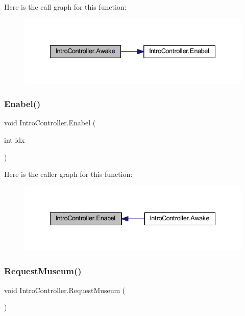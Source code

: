 Here is the call graph for this function\+:
\nopagebreak
\begin{figure}[H]
\begin{center}
\leavevmode
\includegraphics[width=335pt]{class_intro_controller_a2e454b9889a5f12aae6f0b9ada1534e8_cgraph}
\end{center}
\end{figure}
\mbox{\label{class_intro_controller_af189f110e2a1fc56f21c2e5d91af849f}} 
\subsubsection{\texorpdfstring{Enabel()}{Enabel()}}
{\footnotesize\ttfamily void Intro\+Controller.\+Enabel (\begin{DoxyParamCaption}\item[{int}]{idx }\end{DoxyParamCaption})}

Here is the caller graph for this function\+:
\nopagebreak
\begin{figure}[H]
\begin{center}
\leavevmode
\includegraphics[width=335pt]{class_intro_controller_af189f110e2a1fc56f21c2e5d91af849f_icgraph}
\end{center}
\end{figure}
\mbox{\label{class_intro_controller_afdc3da184119a836c16a44e5615bc2f9}} 
\subsubsection{\texorpdfstring{Request\+Museum()}{RequestMuseum()}}
{\footnotesize\ttfamily void Intro\+Controller.\+Request\+Museum (\begin{DoxyParamCaption}{ }\end{DoxyParamCaption})}

